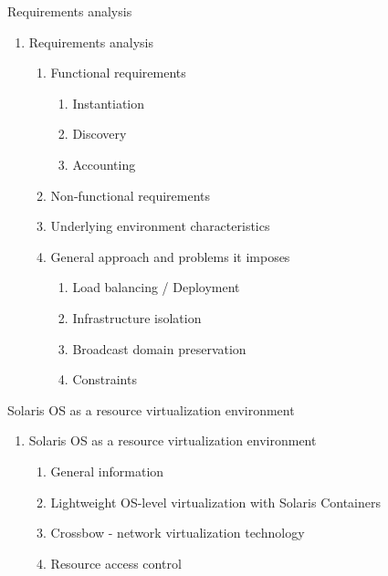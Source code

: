 \documentclass{beamer}
\begin{document}
\begin{frame}{Requirements analysis}

	\begin{enumerate}
		\setcounter{enumi}{\value{enumi_chapter}}

		\item Requirements analysis

			\begin{enumerate}

				\item Functional requirements

					\begin{enumerate}
						\item Instantiation
						\item Discovery
						\item Accounting
					\end{enumerate}

					\pause
			
			 \item Non-functional requirements \pause

			 \item Underlying environment characteristics \pause
		 
			 \item General approach and problems it imposes

			 	\begin{enumerate}
					\item Load balancing / Deployment
					\item Infrastructure isolation
					\item Broadcast domain preservation
					\item Constraints
				\end{enumerate}
		 
			\end{enumerate}

	\end{enumerate}

\end{frame}

\setcounter{enumi_chapter}{\value{enumi}}


\begin{frame}{Solaris OS as a resource virtualization environment}

	\begin{enumerate}
		\setcounter{enumi}{\value{enumi_chapter}}

		\item Solaris OS as a resource virtualization environment

			\begin{enumerate}
				\item General information
				\item Lightweight OS-level virtualization with Solaris Containers
				\item Crossbow - network virtualization technology
				\item Resource access control
			\end{enumerate}

	\end{enumerate}

\end{frame}
\end{document}

